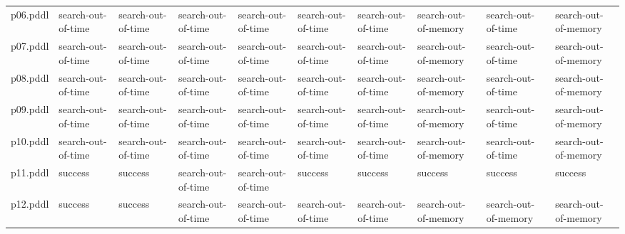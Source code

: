\documentclass{article}
\begin{document}
\begin{tabular}{@{}lrrrrrrrrr@{}}
p06.pddl & \multicolumn{1}{|l|}{search-out-of-time} & \multicolumn{1}{|l|}{search-out-of-time} & \multicolumn{1}{|l|}{search-out-of-time} & \multicolumn{1}{|l|}{search-out-of-time} & \multicolumn{1}{|l|}{search-out-of-time} & \multicolumn{1}{|l|}{search-out-of-time} & \multicolumn{1}{|l|}{search-out-of-memory} & \multicolumn{1}{|l|}{search-out-of-time} & \multicolumn{1}{|l|}{search-out-of-memory} \\
p07.pddl & \multicolumn{1}{|l|}{search-out-of-time} & \multicolumn{1}{|l|}{search-out-of-time} & \multicolumn{1}{|l|}{search-out-of-time} & \multicolumn{1}{|l|}{search-out-of-time} & \multicolumn{1}{|l|}{search-out-of-time} & \multicolumn{1}{|l|}{search-out-of-time} & \multicolumn{1}{|l|}{search-out-of-memory} & \multicolumn{1}{|l|}{search-out-of-time} & \multicolumn{1}{|l|}{search-out-of-memory} \\
p08.pddl & \multicolumn{1}{|l|}{search-out-of-time} & \multicolumn{1}{|l|}{search-out-of-time} & \multicolumn{1}{|l|}{search-out-of-time} & \multicolumn{1}{|l|}{search-out-of-time} & \multicolumn{1}{|l|}{search-out-of-time} & \multicolumn{1}{|l|}{search-out-of-time} & \multicolumn{1}{|l|}{search-out-of-memory} & \multicolumn{1}{|l|}{search-out-of-time} & \multicolumn{1}{|l|}{search-out-of-memory} \\
p09.pddl & \multicolumn{1}{|l|}{search-out-of-time} & \multicolumn{1}{|l|}{search-out-of-time} & \multicolumn{1}{|l|}{search-out-of-time} & \multicolumn{1}{|l|}{search-out-of-time} & \multicolumn{1}{|l|}{search-out-of-time} & \multicolumn{1}{|l|}{search-out-of-time} & \multicolumn{1}{|l|}{search-out-of-memory} & \multicolumn{1}{|l|}{search-out-of-time} & \multicolumn{1}{|l|}{search-out-of-memory} \\
p10.pddl & \multicolumn{1}{|l|}{search-out-of-time} & \multicolumn{1}{|l|}{search-out-of-time} & \multicolumn{1}{|l|}{search-out-of-time} & \multicolumn{1}{|l|}{search-out-of-time} & \multicolumn{1}{|l|}{search-out-of-time} & \multicolumn{1}{|l|}{search-out-of-time} & \multicolumn{1}{|l|}{search-out-of-memory} & \multicolumn{1}{|l|}{search-out-of-time} & \multicolumn{1}{|l|}{search-out-of-memory} \\
p11.pddl & \multicolumn{1}{|l|}{success} & \multicolumn{1}{|l|}{success} & \multicolumn{1}{|l|}{search-out-of-time} & \multicolumn{1}{|l|}{search-out-of-time} & \multicolumn{1}{|l|}{success} & \multicolumn{1}{|l|}{success} & \multicolumn{1}{|l|}{success} & \multicolumn{1}{|l|}{success} & \multicolumn{1}{|l|}{success} \\
p12.pddl & \multicolumn{1}{|l|}{success} & \multicolumn{1}{|l|}{success} & \multicolumn{1}{|l|}{search-out-of-time} & \multicolumn{1}{|l|}{search-out-of-time} & \multicolumn{1}{|l|}{search-out-of-time} & \multicolumn{1}{|l|}{search-out-of-time} & \multicolumn{1}{|l|}{search-out-of-memory} & \multicolumn{1}{|l|}{search-out-of-memory} & \multicolumn{1}{|l|}{search-out-of-memory} \\

\end{tabular}
\end{document}
